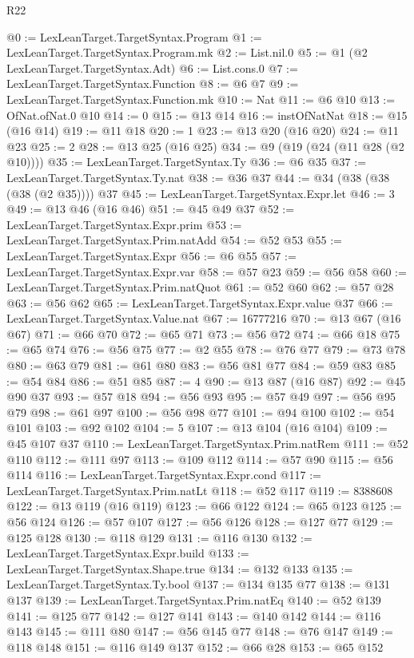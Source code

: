 \begin{lexlean}{R22}
\begin{coremodule}
@0 := LexLeanTarget.TargetSyntax.Program
@1 := LexLeanTarget.TargetSyntax.Program.mk
@2 := List.nil.{0}
@5 := @1 (@2 LexLeanTarget.TargetSyntax.Adt)
@6 := List.cons.{0}
@7 := LexLeanTarget.TargetSyntax.Function
@8 := @6 @7
@9 := LexLeanTarget.TargetSyntax.Function.mk
@10 := Nat
@11 := @6 @10
@13 := OfNat.ofNat.{0} @10
@14 := 0
@15 := @13 @14
@16 := instOfNatNat
@18 := @15 (@16 @14)
@19 := @11 @18
@20 := 1
@23 := @13 @20 (@16 @20)
@24 := @11 @23
@25 := 2
@28 := @13 @25 (@16 @25)
@34 := @9 (@19 (@24 (@11 @28 (@2 @10))))
@35 := LexLeanTarget.TargetSyntax.Ty
@36 := @6 @35
@37 := LexLeanTarget.TargetSyntax.Ty.nat
@38 := @36 @37
@44 := @34 (@38 (@38 (@38 (@2 @35)))) @37
@45 := LexLeanTarget.TargetSyntax.Expr.let
@46 := 3
@49 := @13 @46 (@16 @46)
@51 := @45 @49 @37
@52 := LexLeanTarget.TargetSyntax.Expr.prim
@53 := LexLeanTarget.TargetSyntax.Prim.natAdd
@54 := @52 @53
@55 := LexLeanTarget.TargetSyntax.Expr
@56 := @6 @55
@57 := LexLeanTarget.TargetSyntax.Expr.var
@58 := @57 @23
@59 := @56 @58
@60 := LexLeanTarget.TargetSyntax.Prim.natQuot
@61 := @52 @60
@62 := @57 @28
@63 := @56 @62
@65 := LexLeanTarget.TargetSyntax.Expr.value @37
@66 := LexLeanTarget.TargetSyntax.Value.nat
@67 := 16777216
@70 := @13 @67 (@16 @67)
@71 := @66 @70
@72 := @65 @71
@73 := @56 @72
@74 := @66 @18
@75 := @65 @74
@76 := @56 @75
@77 := @2 @55
@78 := @76 @77
@79 := @73 @78
@80 := @63 @79
@81 := @61 @80
@83 := @56 @81 @77
@84 := @59 @83
@85 := @54 @84
@86 := @51 @85
@87 := 4
@90 := @13 @87 (@16 @87)
@92 := @45 @90 @37
@93 := @57 @18
@94 := @56 @93
@95 := @57 @49
@97 := @56 @95 @79
@98 := @61 @97
@100 := @56 @98 @77
@101 := @94 @100
@102 := @54 @101
@103 := @92 @102
@104 := 5
@107 := @13 @104 (@16 @104)
@109 := @45 @107 @37
@110 := LexLeanTarget.TargetSyntax.Prim.natRem
@111 := @52 @110
@112 := @111 @97
@113 := @109 @112
@114 := @57 @90
@115 := @56 @114
@116 := LexLeanTarget.TargetSyntax.Expr.cond
@117 := LexLeanTarget.TargetSyntax.Prim.natLt
@118 := @52 @117
@119 := 8388608
@122 := @13 @119 (@16 @119)
@123 := @66 @122
@124 := @65 @123
@125 := @56 @124
@126 := @57 @107
@127 := @56 @126
@128 := @127 @77
@129 := @125 @128
@130 := @118 @129
@131 := @116 @130
@132 := LexLeanTarget.TargetSyntax.Expr.build
@133 := LexLeanTarget.TargetSyntax.Shape.true
@134 := @132 @133
@135 := LexLeanTarget.TargetSyntax.Ty.bool
@137 := @134 @135 @77
@138 := @131 @137
@139 := LexLeanTarget.TargetSyntax.Prim.natEq
@140 := @52 @139
@141 := @125 @77
@142 := @127 @141
@143 := @140 @142
@144 := @116 @143
@145 := @111 @80
@147 := @56 @145 @77
@148 := @76 @147
@149 := @118 @148
@151 := @116 @149 @137
@152 := @66 @28
@153 := @65 @152

\end{coremodule}
\end{lexlean}

